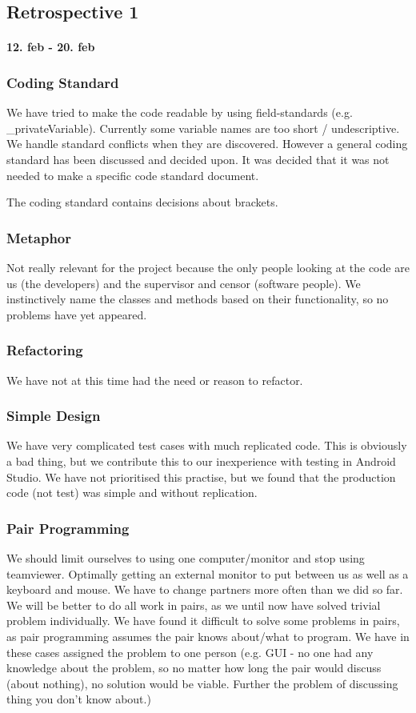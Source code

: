 \subsection*{Retrospective 1}
\paragraph{12. feb - 20. feb}

\subsubsection{Coding Standard}
We have tried to make the code readable by using field-standards (e.g. _privateVariable). Currently some variable names are too short / undescriptive.
We handle standard conflicts when they are discovered.
However a general coding standard has been discussed and decided upon. It was decided that it was not needed to make a specific code standard document.

The coding standard contains decisions about brackets.

\subsubsection{Metaphor}
Not really relevant for the project because the only people looking at the code are us (the developers) and the supervisor and censor (software people).
We instinctively name the classes and methods based on their functionality, so no problems have yet appeared.

\subsubsection{Refactoring}
We have not at this time had the need or reason to refactor.

\subsubsection{Simple Design}
We have very complicated test cases with much replicated code. This is obviously a bad thing, but we contribute this to our inexperience with testing in Android Studio.
We have not prioritised this practise, but we found that the production code (not test) was simple and without replication.

\subsubsection{Pair Programming}
We should limit ourselves to using one computer/monitor and stop using teamviewer. Optimally getting an external monitor to put between us as well as a keyboard and mouse.
We have to change partners more often than we did so far.
We will be better to do all work in pairs, as we until now have solved trivial problem individually.
We have found it difficult to solve some problems in pairs, as pair programming assumes the pair knows about/what to program. We have in these cases assigned the problem to one person (e.g. GUI - no one had any knowledge about the problem, so no matter how long the pair would discuss (about nothing), no solution would be viable. Further the problem of discussing thing you don’t know about.)

